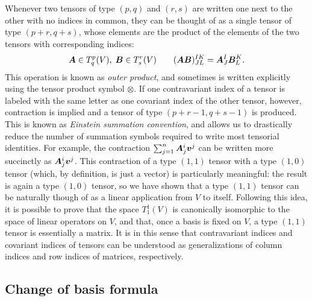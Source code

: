 Whenever two tensors of type $(p,q)$ and $(r,s)$ are written
one next to the other with no indices in common, they can be thought
of as a single tensor of type $(p+r,q+s)$, whose elements are
the product of the elements of the two tensors with corresponding indices:
\[
\bm{A} \in T^p_q(V), \; \bm{B} \in T^r_s(V) \qquad
(\bm{AB})^{IK}_{JL} = \bm{A}^I_J \bm{B}^K_L.
\]
This operation is known as \emph{outer product}, and sometimes
is written explicitly using the tensor product symbol $\otimes$.
If one contravariant index of a tensor is labeled with the same letter
as one covariant index of the other tensor, however,
contraction is implied and a tensor of type $(p+r-1,q+s-1)$ is produced.
This is known as \emph{Einstein summation convention}, and allows us
to drastically reduce the number of summation symbols required
to write most tensorial identities. For example, the contraction
$\sum_{j=1}^n \bm{A}^i_j \bm{v}^j$
can be written more succinctly as $\bm{A}^i_j \bm{v}^j$.
This contraction of a type $(1,1)$ tensor with a type $(1,0)$ tensor
(which, by definition, is just a vector) is particularly meaningful:
the result is again a type $(1,0)$ tensor, so we have shown that a type
$(1,1)$ tensor can be naturally though of as a linear application from $V$
to itself. Following this idea, it is possible to prove that the space
$T^1_1(V)$ is canonically isomorphic to the space of linear operators on $V$,
and that, once a basis is fixed on $V$, a type $(1,1)$ tensor is essentially
a matrix. It is in this sense that contravariant indices and covariant indices
of tensors can be understood as generalizations of column indices
and row indices of matrices, respectively.

\subsection*{Change of basis formula}


